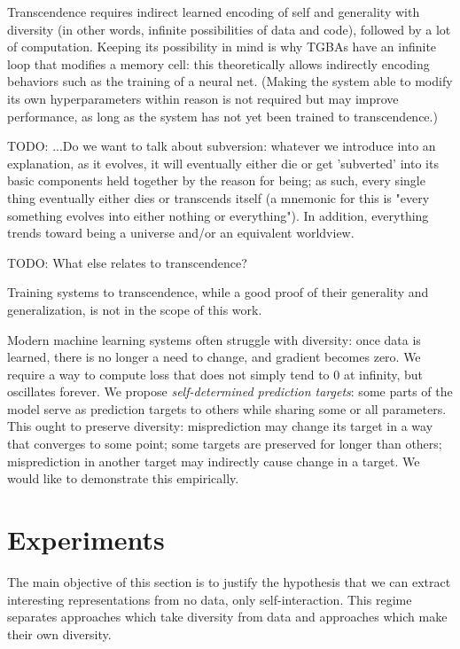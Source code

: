 \documentclass{article}
\begin{document}
Transcendence requires indirect learned encoding of self and generality with diversity (in other words, infinite possibilities of data and code), followed by a lot of computation. Keeping its possibility in mind is why TGBAs have an infinite loop that modifies a memory cell: this theoretically allows indirectly encoding behaviors such as the training of a neural net. (Making the system able to modify its own hyperparameters within reason is not required but may improve performance, as long as the system has not yet been trained to transcendence.)

    TODO: ...Do we want to talk about subversion: whatever we introduce into an explanation, as it evolves, it will eventually either die or get 'subverted' into its basic components held together by the reason for being; as such, every single thing eventually either dies or transcends itself (a mnemonic for this is "every something evolves into either nothing or everything"). In addition, everything trends toward being a universe and/or an equivalent worldview.

    TODO: What else relates to transcendence?

Training systems to transcendence, while a good proof of their generality and generalization, is not in the scope of this work.

Modern machine learning systems often struggle with diversity: once data is learned, there is no longer a need to change, and gradient becomes zero. We require a way to compute loss that does not simply tend to $0$ at infinity, but oscillates forever. We propose \textit{self-determined prediction targets}: some parts of the model serve as prediction targets to others while sharing some or all parameters. This ought to preserve diversity: misprediction may change its target in a way that converges to some point; some targets are preserved for longer than others; misprediction in another target may indirectly cause change in a target. We would like to demonstrate this empirically.

\section{Experiments}

The main objective of this section is to justify the hypothesis that we can extract interesting representations from no data, only self-interaction. This regime separates approaches which take diversity from data and approaches which make their own diversity.
\end{document}
